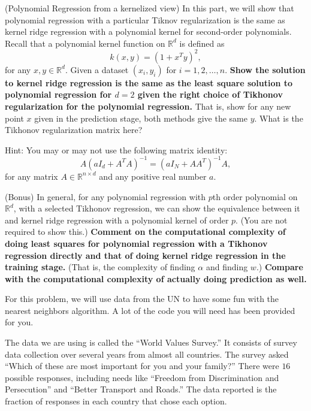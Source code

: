 \begin{Parts}
\Part (Polynomial Regression from a kernelized view) In this part, we will show that polynomial regression with a particular Tiknov regularization is the same as kernel ridge regression with a polynomial kernel for second-order polynomials. Recall that a polynomial kernel function on $\mathbb R^d$ is defined as 
\begin{equation}
k(x,y) = (1+x^Ty)^2,
\end{equation}
for any $x,y\in\mathbb R^d$. Given a dataset $(x_i,y_i)$ for
$i=1,2,\dots, n$. {\bf Show the solution to kernel ridge regression is
  the same as the least square solution to polynomial regression for
  $d=2$ given the right choice of Tikhonov regularization for the
  polynomial regression.} That is, show for any new point $x$ given in the prediction stage, both methods give the same $y$. What is the Tikhonov regularization matrix here? 

Hint: You may or may not use the following matrix identity:
\begin{equation}
A(a I_d + A^T A)^{-1} = (a I_N + A A^T)^{-1}A,
\end{equation}
for any matrix $A\in\mathbb R^{n\times d}$ and any positive real number $a$.  





\Part (Bonus) In general, for any polynomial regression with $p$th
order polynomial on $\mathbb R^d$, with a selected Tikhonov
regression, we can show the equivalence between it and kernel ridge
regression with a polynomial kernel of order $p$. (You are not
required to show this.) {\bf Comment on the computational complexity
  of doing least squares for polynomial regression with a Tikhonov
  regression directly and that of doing kernel ridge regression in the
  training stage.} (That is, the complexity of finding $\alpha$ and
finding $w$.) {\bf Compare with the computational complexity of
  actually doing prediction as well.}

 

\end{Parts}  

For this problem, we will use data from the UN to have some fun with the nearest neighbors algorithm. A lot of the code you will need has been provided for you.

The data we are using is called the ``World Values Survey.'' It consists of survey data collection over several years from almost all countries. The survey asked ``Which of these are most important for you and your family?'' There were $16$ possible responses, including needs like ``Freedom from Discrimination and Persecution'' and ``Better Transport and Roads.'' The data reported is the fraction of responses in each country that chose each option.

